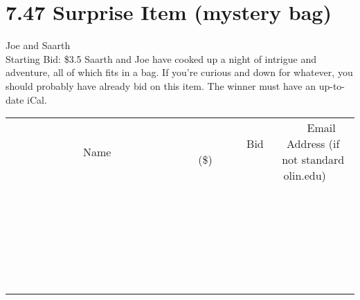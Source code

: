 \documentclass[11pt]{article}
\begin{document}
\section*{7.47 Surprise Item (mystery bag)}
Joe and Saarth
\\
Starting Bid: \$3.5
\newline
Saarth and Joe have cooked up a night of intrigue and adventure, all of which fits in a bag. If you're curious and down for whatever, you should probably have already bid on this item. The winner must have an up-to-date iCal.
\\[6ex]
\begin{tabular}{c c c}
~~~~~~~~~~~~~Name~~~~~~~~~~~~~ & ~~~~~~~~~Bid (\$)~~~~~~~~~  & ~~~Email Address (if not standard olin.edu)~~~\\
 & & \\
\hline
 & & \\
\hline
 & & \\
\hline
 & & \\
\hline
 & & \\
\hline
 & & \\
\hline
 & & \\
\hline
 & & \\
\hline
 & & \\
\hline
 & & \\
\hline
 & & \\
\hline
 & & \\
\hline
 & & \\
\hline
 & & \\
\hline
 & & \\
\hline
 & & \\
\hline
 & & \\
\hline
 & & \\
\hline
 & & \\
\hline
 & & \\
\hline
 & & \\
\hline
 & & \\
\hline
 & & \\
\hline
 & & \\
\hline
 & & \\
\hline
 & & \\
\hline
\end{tabular}
\newpage
\end{document}
